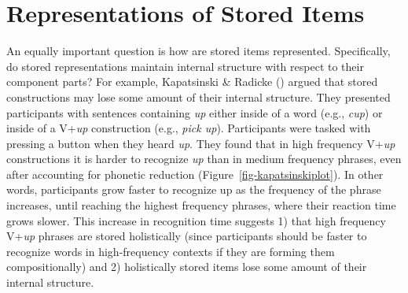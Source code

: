 \documentclass[
  12pt,
  letterpaper,
]{scrreprt}
\begin{document}
\section{Representations of Stored
Items}\label{sec-representations-of-stored-items}

An equally important question is how are stored items represented.
Specifically, do stored representations maintain internal structure with
respect to their component parts? For example, Kapatsinski \& Radicke
() argued
that stored constructions may lose some amount of their internal
structure. They presented participants with sentences containing
\emph{up} either inside of a word (e.g., \emph{cup}) or inside of a
V+\emph{up} construction (e.g., \emph{pick up}). Participants were
tasked with pressing a button when they heard \emph{up}. They found that
in high frequency V+\emph{up} constructions it is harder to recognize
\emph{up} than in medium frequency phrases, even after accounting for
phonetic reduction (Figure~\ref{fig-kapatsinskiplot}). In other words,
participants grow faster to recognize up as the frequency of the phrase
increases, until reaching the highest frequency phrases, where their
reaction time grows slower. This increase in recognition time suggests
1) that high frequency V+\emph{up} phrases are stored holistically
(since participants should be faster to recognize words in
high-frequency contexts if they are forming them compositionally) and 2)
holistically stored items lose some amount of their internal structure.
\end{document}
